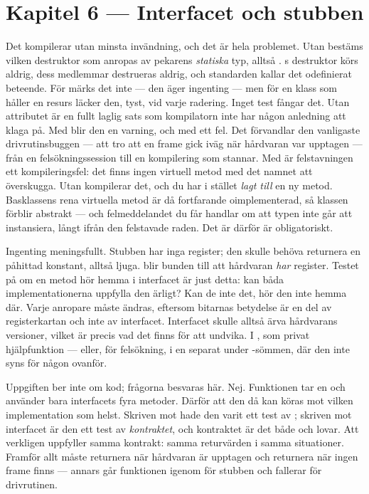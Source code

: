 \section*{Kapitel 6 --- Interfacet och stubben}

 Det kompilerar utan minsta invändning, och det är hela problemet. Utan 
bestäms vilken destruktor som anropas av pekarens \emph{statiska} typ, alltså .
s destruktor körs aldrig, dess medlemmar destrueras aldrig, och standarden kallar det
odefinierat beteende. För  märks det inte --- den äger ingenting --- men för en klass
som håller en resurs läcker den, tyst, vid varje radering. Inget test fångar det.
 Utan attributet är  en fullt laglig sats som kompilatorn inte
har någon anledning att klaga på. Med \code{[[nodiscard]]} blir den en varning, och med
 ett fel. Det förvandlar den vanligaste drivrutinsbuggen --- att tro att en frame
gick iväg när hårdvaran var upptagen --- från en felsökningssession till en kompilering som
stannar.
 Med  är felstavningen ett kompileringsfel: det finns ingen virtuell metod
med det namnet att överskugga. Utan  kompilerar det, och du har i stället
\emph{lagt till} en ny metod. Basklassens rena virtuella metod är då fortfarande oimplementerad,
så klassen förblir abstrakt --- och felmeddelandet du får handlar om att typen inte går att
instansiera, långt ifrån den felstavade raden. Det är därför  är obligatoriskt.

 Ingenting meningsfullt. Stubben har inga register; den skulle behöva returnera en påhittad
konstant, alltså ljuga.
  blir bunden till att hårdvaran \emph{har} register. Testet på om en metod
hör hemma i interfacet är just detta: kan båda implementationerna uppfylla den ärligt? Kan de inte
det, hör den inte hemma där.
 Varje anropare måste ändras, eftersom bitarnas betydelse är en del av registerkartan och
inte av interfacet. Interfacet skulle alltså ärva hårdvarans versioner, vilket är precis vad det
finns för att undvika.
 I , som privat hjälpfunktion --- eller, för felsökning, i en separat
 under -sömmen, där den inte syns för någon ovanför.

Uppgiften ber inte om kod; frågorna besvaras här.
 Nej. Funktionen tar en  och använder bara interfacets fyra
metoder.
 Därför att den då kan köras mot vilken implementation som helst. Skriven mot 
hade den varit ett test av ; skriven mot interfacet är den ett test av
\emph{kontraktet}, och kontraktet är det både  och  lovar.
 Att  verkligen uppfyller samma kontrakt: samma returvärden i samma situationer.
Framför allt måste  returnera  när hårdvaran är upptagen och
 returnera  när ingen frame finns --- annars går funktionen igenom för
stubben och fallerar för drivrutinen.


